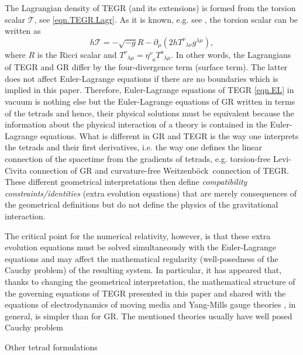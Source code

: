 \documentclass[
10pt, %
a4paper, %
oneside, %
headinclude,footinclude, %
BCOR5mm, %
]{scrartcl}
\newcommand{\pd}[1]{\partial_{#1}}
\newcommand{\itetrsymbol}{\eta}
\newcommand{\itetr}[2]{\itetrsymbol^{#1}_{\phantom{#1}#2}}
\newcommand{\Tors}[2]{T^{#1}_{\phantom{a}#2}}
\newcommand{\We}{Weitzenb\"ock}
\newcommand{\Tscal}{\mathcal{T}}		%
\begin{document}
The Lagrangian density of TEGR (and its extensions) is formed from the torsion scalar $ \Tscal 
$, see \eqref{eqn.TEGR.Lagr}. As it is known, e.g. see \cite[Eq.(9.30)]{AldrovandiPereiraBook}, the 
torsion scalar can be written as
\begin{equation}\label{eqn.TR}
	h \Tscal = -\sqrt{-g} R - \pd{\mu}(2 h \Tors{\nu}{\lambda\nu}g^{\lambda
	\mu}),
\end{equation}
where $ R $ is the Ricci scalar and $ \Tors{\nu}{\lambda\mu} = \itetr{\nu}{a} \Tors{a}{\lambda\mu} 
$. In other words, the Lagrangians of TEGR and GR differ by the four-divergence term (surface 
term). The latter does not affect Euler-Lagrange equations if there are no boundaries which is 
implied in this paper. 
Therefore, Euler-Lagrange equations of TEGR \eqref{eqn.EL} in vacuum is nothing else but the 
Euler-Lagrange 
equations of GR written in terms of the tetrads and hence, their physical solutions must be 
equivalent because the information about the physical interaction of a theory is contained in the 
Euler-Lagrange equations. What is different in GR and TEGR is the 
way one interprets the tetrads and their first derivatives, i.e. the way one defines the linear 
connection of the spacetime from the gradients of tetrads, e.g. torsion-free Levi-Civita connection 
of GR and curvature-free \We\ connection of TEGR. These different geometrical 
interpretations then define \emph{compatibility constraints/identities} (extra evolution equations) 
that are merely consequences of the geometrical definitions but do not define the physics of the 
gravitational interaction. %

The critical point for the numerical relativity, however, is that 
these extra evolution equations must be solved simultaneously with the Euler-Lagrange equations and
may affect the mathematical 
regularity (well-posedness of the Cauchy problem) of the resulting system. In particular, it has 
appeared that, thanks to changing the geometrical interpretation, the 
mathematical structure of the 
governing 
equations of TEGR presented in this paper and shared with the equations of electrodynamics of 
moving media \cite{Obukhov2008,DPRZ2017,Hohmann2018a} and Yang-Mills gauge theories 
\cite{RakotomananaBook}, in general, is 
simpler than for GR. The mentioned theories usually have well posed Cauchy problem 

Other tetrad formulations \cite{Buchman2003}
\end{document}
